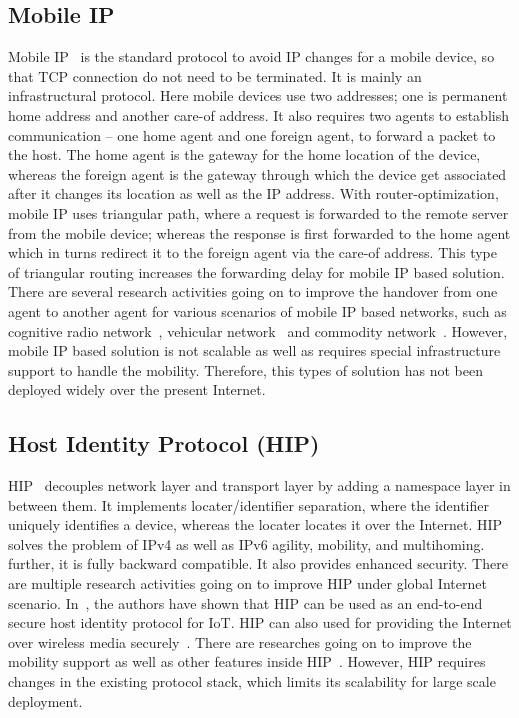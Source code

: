 \subsection{Mobile IP}
Mobile IP~\cite{MobileIp} is the standard protocol to avoid IP changes for a mobile device, so that TCP connection do not need to be terminated. It is mainly an infrastructural protocol. Here mobile devices use two addresses; one is permanent home address and another care-of address. It also requires two agents to establish communication -- one home agent and one foreign agent, to forward a packet to the host. The home agent is the gateway for the home location of the device, whereas the foreign agent is the gateway through which the device get associated after it changes its location as well as the IP address.  With router-optimization, mobile IP uses triangular path, where a request is forwarded to the remote server from the mobile device; whereas the response is first forwarded to the home agent which in turns redirect it to the foreign agent via the care-of address. This type of triangular routing increases the forwarding delay for mobile IP based solution. There are several research activities going on to improve the handover from one agent to another agent for various scenarios of mobile IP based networks, such as cognitive radio network~\cite{MobileIpCognitive}, vehicular network~\cite{MobileIpVehicular2015,MobileIpVehicular2016} and commodity network~\cite{MobileIpHandover}. However, mobile IP based solution is not scalable as well as requires special infrastructure support to handle the mobility. Therefore, this types of solution has not been deployed widely over the present Internet. 

\subsection{Host Identity Protocol (HIP)}
HIP~\cite{HIP} decouples network layer and transport layer by adding a namespace layer in between them. It implements locater/identifier separation, where the identifier uniquely identifies a device, whereas the locater locates it over the Internet. HIP solves the problem of IPv4 as well as IPv6 agility, mobility, and multihoming. further, it is fully backward compatible. It also provides enhanced security. There are multiple research activities going on to improve HIP under global Internet scenario. In~\cite{HIPIoT}, the authors have shown that HIP can be used as an end-to-end secure host identity protocol for IoT. HIP can also used for providing the Internet over wireless media securely~\cite{HIPPubliceWifi}. There are researches going on to improve the mobility support as well as other features inside HIP~\cite{HIPMobility,HIPMobilityEnhanced,HIPMobilitySimulte}. However, HIP requires changes in the existing protocol stack, which limits its scalability for large scale deployment. 

